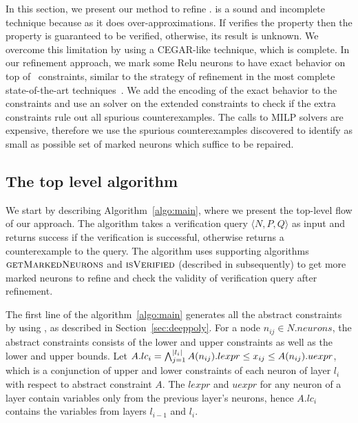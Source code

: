 In this section, we present our method to refine \deeppoly{}. \deeppoly{} is a sound and incomplete technique because as it does over-approximations. If \deeppoly{} verifies the property then the property is guaranteed to be verified, otherwise, its result is unknown. We overcome this limitation by using a CEGAR-like technique, which is complete. In our refinement approach, we mark some Relu neurons to have exact behavior on top of~\deeppoly{} constraints, similar to the strategy of refinement in the most complete state-of-the-art techniques~\cite{wang2021beta}. We add the encoding of the exact behavior to the~\deeppoly{} constraints and use an \milp{} solver on the extended constraints to check if the extra constraints rule out all spurious counterexamples. The calls to MILP solvers are expensive, therefore we use the spurious counterexamples discovered to identify as small as possible set of marked neurons which suffice to be repaired. %

\subsection{The top level algorithm}
\label{sec:toplevelalgo}
We start by describing Algorithm~\ref{algo:main}, where we present the top-level flow of our approach. The algorithm takes a verification query $\langle N,P,Q \rangle$ as input and returns success if the verification is successful, otherwise returns a counterexample to the query. The algorithm uses supporting algorithms $\textsc{getMarkedNeurons}$ and $\textsc{isVerified}$ (described in subsequently) to get more marked neurons to refine and check the validity of verification query after refinement.

The first line of the algorithm~\ref{algo:main} generates all the abstract constraints by using \deeppoly{}, as described in Section~\ref{sec:deeppoly}. For a node $n_{ij} \in N.neurons$, the abstract constraints consists of the lower and upper constraints as well as the lower and upper bounds. Let $A.lc_i = \bigwedge_{j=1}^{|l_i|} A(n_{ij}).lexpr \leq x_{ij} \leq  A(n_{ij}).uexpr$, which is a conjunction of upper and lower constraints of each neuron of layer $l_i$ with respect to abstract constraint $A$. The $lexpr$ and $uexpr$ for any neuron of a layer contain variables only from the previous layer's neurons, hence $A.lc_i$ contains the variables from layers $l_{i-1}$ and $l_i$. 

